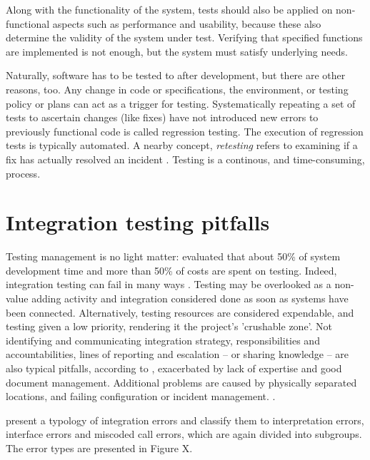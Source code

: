 \documentclass[12pt,a4paper,oneside,pdftex]{report}
\begin{document}
{%
Along with the functionality of the system, tests should also be applied on non-functional aspects such as performance and usability, because these also determine the validity of the system under test. Verifying that specified functions are implemented is not enough, but the system must satisfy underlying needs.

Naturally, software has to be tested to after development, but there are other reasons, too. Any change in code or specifications, the environment, or testing policy or plans can act as a trigger for testing. Systematically repeating a set of tests to ascertain changes (like fixes) have not introduced new errors to previously functional code is called regression testing. The execution of regression tests is typically automated. A nearby concept, \textit{retesting} refers to examining if a fix has actually resolved an incident \citep{jenkins2008software}. Testing is a continous, and time-consuming, process.

\section{Integration testing pitfalls}

Testing management is no light matter: \citet{reid2005art} evaluated that about 50\% of system development time and more than 50\% of costs are spent on testing. Indeed, integration testing can fail in many ways \citep{van2008identifying}. Testing may be overlooked as a non-value adding activity and integration considered done as soon as systems have been connected. Alternatively, testing resources are considered expendable, and testing given a low priority, rendering it the project's 'crushable zone'. Not identifying and communicating integration strategy, responsibilities and accountabilities, lines of reporting and escalation -- or sharing knowledge -- are also typical pitfalls, according to \citet{van2008identifying}, exacerbated by lack of expertise and good document management. Additional problems are caused by physically separated locations, and failing configuration or incident management. \citep{van2008identifying}.

\citet{leung1990study} present a typology of integration errors and classify them to interpretation errors, interface errors and miscoded call errors, which are again divided into subgroups. The error types are presented in Figure X.

}
\end{document}
